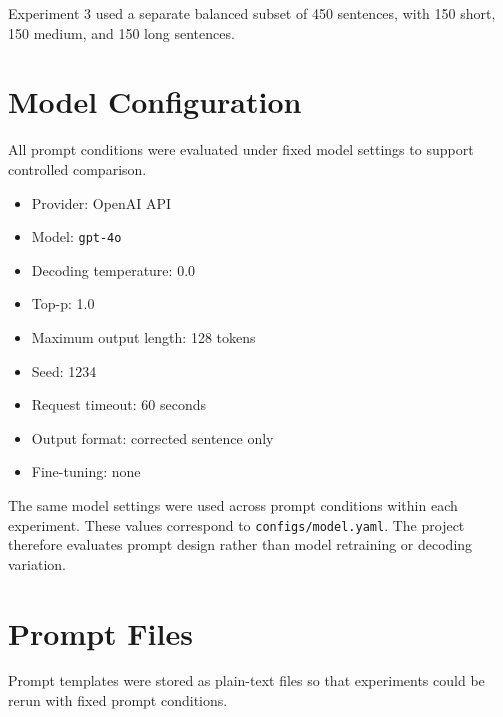 Experiment 3 used a separate balanced subset of 450 sentences, with 150 short, 150 medium, and 150 long sentences.

\section{Model Configuration}

All prompt conditions were evaluated under fixed model settings to support controlled comparison.

\begin{itemize}
    \item Provider: OpenAI API
    \item Model: \texttt{gpt-4o}
    \item Decoding temperature: 0.0
    \item Top-p: 1.0
    \item Maximum output length: 128 tokens
    \item Seed: 1234
    \item Request timeout: 60 seconds
    \item Output format: corrected sentence only
    \item Fine-tuning: none
\end{itemize}

The same model settings were used across prompt conditions within each experiment. These values correspond to \texttt{configs/model.yaml}. The project therefore evaluates prompt design rather than model retraining or decoding variation.

\section{Prompt Files}

Prompt templates were stored as plain-text files so that experiments could be rerun with fixed prompt conditions.

